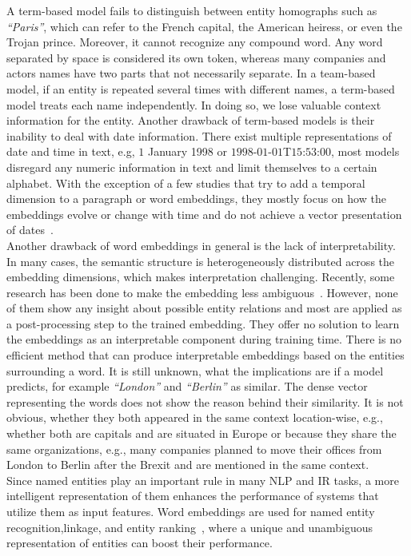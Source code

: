 A term-based model fails to distinguish between entity homographs such as  \emph{``Paris''},  which can refer to the French capital, the American heiress, or even the Trojan prince. Moreover, it cannot recognize any compound word. Any word separated by space is considered its own token, whereas many companies and actors names have two parts that not necessarily separate.  In a team-based model, if an entity is repeated several times with different names, a term-based model treats each name independently. In doing so, we lose valuable context information for the entity. Another drawback of term-based models is their inability to deal with date information. There exist multiple representations of date and time in text, e.g, $1$ January 1998 or $1998$-$01$-$01$T$15$:$53$:$00$, most models disregard any numeric information in text and limit themselves to a certain alphabet. With the exception of a few studies that try to add a temporal dimension to a paragraph or word embeddings, they mostly focus on how the embeddings evolve or change with time and do not achieve a vector presentation of dates~.  \\
Another drawback of word embeddings in general is the lack of interpretability. In many cases, the semantic structure is heterogeneously distributed across the embedding dimensions, which makes interpretation challenging. Recently, some research has been done to make the embedding less ambiguous~. However, none of them show any insight about possible entity relations and most are applied as a post-processing step to the trained embedding. They offer no solution to learn the embeddings as an interpretable component during training time. There is no efficient method that can produce interpretable embeddings based on the entities surrounding a word. It is still unknown, what the implications are if a model predicts, for example  \emph{``London''} and \emph{``Berlin''} as similar. The dense vector representing the words does not show the reason behind their similarity. It is not obvious, whether they both appeared in the same context location-wise, e.g., whether both are capitals and are situated in Europe or because they share the same organizations, e.g., many companies planned to move their offices from London to Berlin after the Brexit and are mentioned in the same context. \\
Since named entities play an important rule in many NLP and IR tasks, a more intelligent representation of them enhances the performance of systems that utilize them as input features. Word embeddings are used for named entity recognition,linkage, and entity ranking~, where a unique and unambiguous representation of entities can boost their performance.
